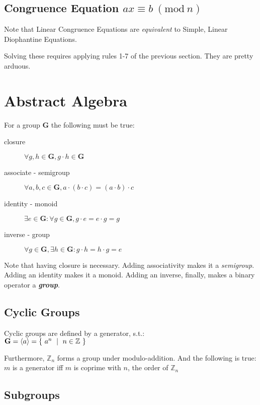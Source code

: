 \documentclass{article}
\newcommand{\congr}[3]{
  #1 \equiv #2\ (\textrm{mod}\ #3)
}
\begin{document}
  \subsection{Congruence Equation $\congr{ax}{b}{n}$}

  Note that Linear Congruence Equations are \emph{equivalent} to
  Simple, Linear Diophantine Equations.

  Solving these requires applying rules 1-7 of the previous section. They are pretty arduous.

  \pagebreak
  \section{Abstract Algebra}

  For a group $\mathbf{G}$ the following must be true:
  \begin{description}
    \item[closure]
      $\forall g, h \in \mathbf{G}, g \cdot h \in \mathbf{G}$
    \item[associate - semigroup]
      $\forall a, b, c \in \mathbf{G}, a \cdot (b \cdot c) = (a \cdot b) \cdot c$
    \item[identity - monoid]
      $\exists e \in \mathbf{G} : \forall g \in \mathbf{G}, g \cdot e = e \cdot g = g$
    \item[inverse - group]
      $\forall g \in \mathbf{G}, \exists h \in \mathbf{G} : g \cdot h = h \cdot g = e$
  \end{description}

  Note that having closure is necessary. Adding associativity makes it a
  \emph{semigroup}. Adding an identity makes it a monoid. Adding an inverse,
  finally, makes a binary operator a \emph{\bf group}.

  \subsection{Cyclic Groups}

  Cyclic groups are defined by a generator, s.t.: \\
  $\mathbf{G} = \langle a \rangle = \{\ a^n\ \mid\ n \in \mathbb{Z}\ \}$

  Furthermore, $\mathbb{Z}_n$ forms a group under modulo-addition. And the following is true:\\
  $m$ is a generator iff $m$ is coprime with $n$, the order of $\mathbb{Z}_n$

  \subsection{Subgroups}
\end{document}
